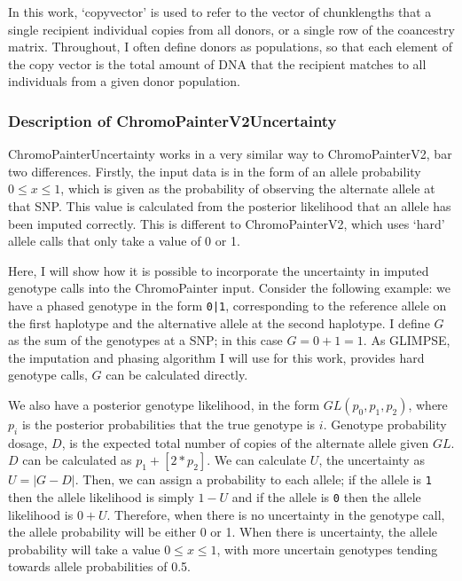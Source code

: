 In this work, `copyvector' is used to refer to the vector of chunklengths that a single recipient individual copies from all donors, or a single row of the coancestry matrix. Throughout, I often define donors as populations, so that each element of the copy vector is the total amount of DNA that the recipient matches to all individuals from a given donor population.

\subsubsection{Description of ChromoPainterV2Uncertainty} \label{sec:DescriptionChromoPainterV2Uncertainty}

ChromoPainterUncertainty works in a very similar way to ChromoPainterV2, bar two differences. Firstly, the input data is in the form of an allele probability $0 \leq x \leq 1$, which is given as the probability of observing the alternate allele at that SNP. This value is calculated from the posterior likelihood that an allele has been imputed correctly. This is different to ChromoPainterV2, which uses `hard' allele calls that only take a value of 0 or 1.

Here, I will show how it is possible to incorporate the uncertainty in imputed genotype calls into the ChromoPainter input. Consider the following example: we have a phased genotype in the form \texttt{0|1}, corresponding to the reference allele on the first haplotype and the alternative allele at the second haplotype. I define $G$ as the sum of the genotypes at a SNP; in this case $G=0+1=1$. As GLIMPSE, the imputation and phasing algorithm I will use for this work, provides hard genotype calls, $G$ can be calculated directly.

We also have a posterior genotype likelihood, in the form $GL(p_{0}, p_{1}, p_{2})$, where $p_i$ is the posterior probabilities that the true genotype is $i$. Genotype probability dosage, $D$, is the expected total number of copies of the alternate allele given $GL$. $D$ can be calculated as $p_{1} + [2*p_{2}]$. We can calculate $U$, the uncertainty as $U = |G-D|$. Then, we can assign a probability to each allele; if the allele is \texttt{1} then the allele likelihood is simply $1 - U$ and if the allele is \texttt{0} then the allele likelihood is $0 + U$. Therefore, when there is no uncertainty in the genotype call, the allele probability will be either 0 or 1. When there is uncertainty, the allele probability will take a value $0 \leq x \leq 1$, with more uncertain genotypes tending towards allele probabilities of 0.5. 
                 
